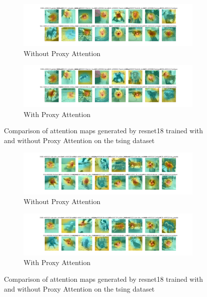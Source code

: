 \begin{figure}[!htb]
    \centering
    \begin{subfigure}[b]{1\textwidth}
        \includegraphics[width=\textwidth]{images/tsing_resnet18_noproxy_2.pdf}
        \caption{Without Proxy Attention}
    \end{subfigure}
    \hfill
    \begin{subfigure}[b]{1\textwidth}
        \includegraphics[width=\textwidth]{images/tsing_resnet18_proxy_2.pdf}
        \caption{With Proxy Attention}
    \end{subfigure}
    \caption{Comparison of attention maps generated by resnet18 trained with and without Proxy Attention on the tsing dataset}
\end{figure}


\begin{figure}[!htb]
    \centering
    \begin{subfigure}[b]{1\textwidth}
        \includegraphics[width=\textwidth]{images/tsing_resnet18_noproxy_3.pdf}
        \caption{Without Proxy Attention}
    \end{subfigure}
    \hfill
    \begin{subfigure}[b]{1\textwidth}
        \includegraphics[width=\textwidth]{images/tsing_resnet18_proxy_3.pdf}
        \caption{With Proxy Attention}
    \end{subfigure}
    \caption{Comparison of attention maps generated by resnet18 trained with and without Proxy Attention on the tsing dataset}
\end{figure}



